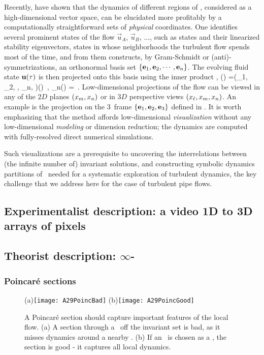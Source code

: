 Recently, \cite{GHCW07} have shown that the dynamics of different regions
of {\statesp}, considered as a high-dimensional vector space, can be
elucidated more profitably by a computationally straight\-forward sets of
\emph{physical} coordinates. One identifies several prominent states of
the flow $\vec{u}_A$, $\vec{u}_B$, $\dots$, such as {\eqv} states and
their linearized stability eigenvectors, states in whose neighborhoods
the turbulent flow spends most of the time, and from them constructs, by
Gram-Schmidt or (anti)-symmetrizations, an orthonormal basis set
$\{{\bf e}_1, {\bf e}_2, \cdots, {\bf e}_n\}$. The evolving fluid state ${\bf u}(\tau)$
is then projected onto this basis using the inner product
,
\beq
\ssp(\zeit) =(\ssp_1, \ssp_2, \cdots, \ssp_n, \cdots)(\zeit)
    \,,\qquad
\ssp_n(\zeit) = 
\,.
Low-dimensional projections of the flow can be viewed in any of the $2D$ planes
$(x_m, x_n)$ or in $3D$ perspective views $(x_{\ell},x_m,
x_n)$. An example is the  projection on
the $3$\dmn\ frame $\{{{\bf e}}_1,{{\bf e}}_2,{{\bf e}}_3\}$ defined in .
It is worth emphasizing that the method affords low-dimensional {\em
visualization} without any low-dimensional {\em modeling} or dimension
reduction; the dynamics are computed with fully-resolved direct numerical
simulations.

Such visualizations are a prerequisite to uncovering the
interrelations between (the infinite number of) invariant solutions, and
constructing symbolic dynamics partitions of \statesp\ needed for a
systematic exploration of turbulent dynamics, the key challenge that we
address here for the case of turbulent pipe flows.

\subsection{Experimentalist description: a video 1D to 3D arrays of pixels}
\subsection{Theorist description: $\infty$-\dmn\ \statesp}

\subsubsection{Poincar\'e sections}
\label{s:PoincSecFlot}

\begin{figure}
   \centering
(a)\texttt{[image: A29PoincBad]}
(b)\texttt{[image: A29PoincGood]}
   \caption{\label{fig:A29PoincBad}
A Poincar\'e section should capture important features of the local flow.
    (a)
A section through a \template\ off the invariant set is bad, as it misses
dynamics around a nearby \eqv.
    (b)
If an \eqv\ is chosen as a \template, the section is good - it captures
all local dynamics.
}
\end{figure}

